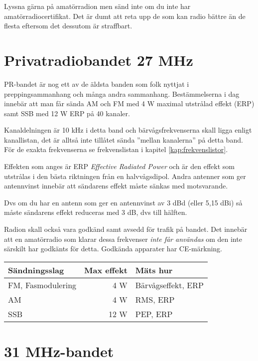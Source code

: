 \documentclass[12ypt,swedish,a4paper]{report}
\begin{document}
Lyssna gärna på amatörradion men sänd inte om du inte har amatörradiocertifikat. Det är dumt att reta upp de som kan radio bättre än de flesta eftersom det dessutom är straffbart.

\section{Privatradiobandet 27 MHz}

PR-bandet är nog ett av de äldsta banden som folk nyttjat i preppingsammanhang och många andra sammanhang. Bestämmelserna i dag innebär att man får sända AM och FM med 4 W maximal utstrålad effekt (ERP) samt SSB med 12 W ERP på 40 kanaler.

Kanaldelningen är 10 kHz i detta band och bärvågsfrekvenserna skall ligga enligt kanallistan, det är alltså inte tillåtet sända ''mellan kanalerna'' på detta band. För de exakta frekvenserna se frekvenslistan i kapitel \ref{kap:frekvenslistor}. 

Effekten som anges är ERP \textit{Effective Radiated Power} och är den effekt som utstrålas i den bästa riktningen från en halvvågsdipol. Andra antenner som ger antennvinst innebär att sändarens effekt måste sänkas med motsvarande.


Dvs om du har en antenn som ger en antennvinst av 3 dBd (eller 5,15 dBi) så måste sändarens effekt reduceras med 3 dB, dvs till hälften.

Radion skall också vara godkänd samt avsedd för trafik på bandet. Det innebär att en amatörradio som klarar dessa frekvenser \textit{inte får användas} om den inte särskilt har godkänts för detta. Godkända apparater har CE-märkning.

\begin{table}[h]
\begin{tabular}{lrl}
	Sändningsslag     & Max effekt & Mäts hur           \\ \hline
	FM, Fasmodulering &        4 W & Bärvågseffekt, ERP \\
	AM                &        4 W & RMS, ERP           \\
	SSB               &       12 W & PEP, ERP
\end{tabular}
\end{table}

\section{31 MHz-bandet}
\end{document}

